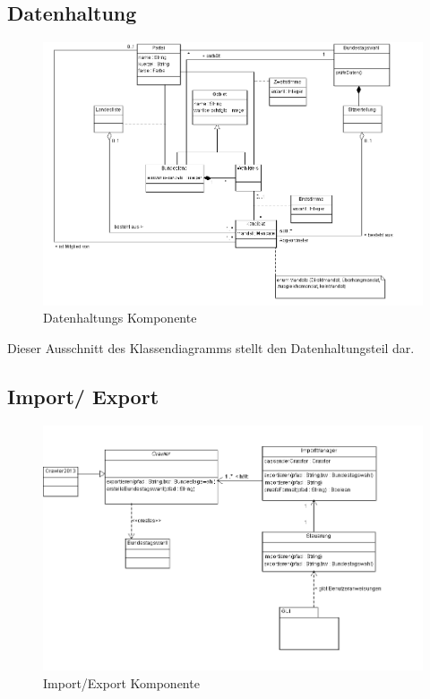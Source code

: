 \documentclass[12pt,a4paper,titlepage]{article}
\begin{document}
\subsection{Datenhaltung}
\begin{figure}[!ht]
\includegraphics[scale=0.4]{Datenhaltung-Ausschnitt} \caption{Datenhaltungs Komponente} 
\end{figure}

Dieser Ausschnitt des Klassendiagramms stellt den Datenhaltungsteil dar.
\newpage
\subsection{Import/ Export}
\begin{figure}[!ht]
\includegraphics[scale=0.5]{Import-Export_Ausschnitt} \caption{Import/Export Komponente} 
\end{figure}
\end{document}
